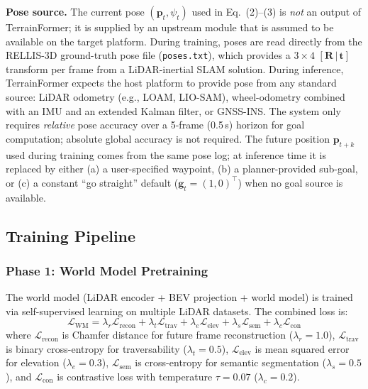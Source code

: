 \documentclass[sensors,article,submit,pdftex,moreauthors]{Definitions/mdpi}
\begin{document}
\textbf{Pose source.}
The current pose $(\mathbf{p}_t, \psi_t)$ used in Eq.~(2)--(3) is \emph{not} an output of TerrainFormer; it is supplied by an upstream module that is assumed to be available on the target platform. During training, poses are read directly from the RELLIS-3D ground-truth pose file (\texttt{poses.txt}), which provides a $3 \times 4$ \mbox{$[\mathbf{R}\,|\,\mathbf{t}]$} transform per frame from a LiDAR-inertial SLAM solution. During inference, TerrainFormer expects the host platform to provide pose from any standard source: LiDAR odometry (e.g., LOAM, LIO-SAM), wheel-odometry combined with an IMU and an extended Kalman filter, or GNSS-INS. The system only requires \emph{relative} pose accuracy over a 5-frame (0.5\,s) horizon for goal computation; absolute global accuracy is not required. The future position $\mathbf{p}_{t+k}$ used during training comes from the same pose log; at inference time it is replaced by either (a) a user-specified waypoint, (b) a planner-provided sub-goal, or (c) a constant ``go straight'' default ($\mathbf{g}_t = (1, 0)^\top$) when no goal source is available.

\subsection{Training Pipeline}
\label{sec:training}

\subsubsection{Phase 1: World Model Pretraining}
The world model (LiDAR encoder + BEV projection + world model) is trained via self-supervised learning on multiple LiDAR datasets. The combined loss is:
\begin{equation}
    \mathcal{L}_\text{WM} = \lambda_r \mathcal{L}_\text{recon} + \lambda_t \mathcal{L}_\text{trav} + \lambda_e \mathcal{L}_\text{elev} + \lambda_s \mathcal{L}_\text{sem} + \lambda_c \mathcal{L}_\text{con}
\end{equation}
where $\mathcal{L}_\text{recon}$ is Chamfer distance for future frame reconstruction ($\lambda_r = 1.0$), $\mathcal{L}_\text{trav}$ is binary cross-entropy for traversability ($\lambda_t = 0.5$), $\mathcal{L}_\text{elev}$ is mean squared error for elevation ($\lambda_e = 0.3$), $\mathcal{L}_\text{sem}$ is cross-entropy for semantic segmentation ($\lambda_s = 0.5$), and $\mathcal{L}_\text{con}$ is contrastive loss with temperature $\tau = 0.07$ ($\lambda_c = 0.2$).
\end{document}
